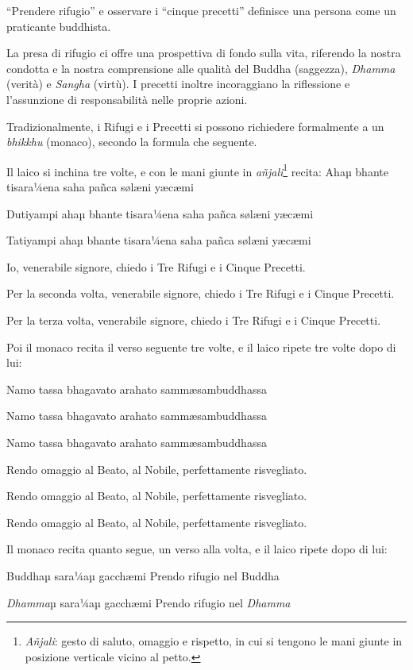 

``Prendere rifugio'' e osservare i ``cinque precetti'' definisce una persona
come un praticante buddhista.

La presa di rifugio ci offre una prospettiva di fondo sulla vita,
riferendo la nostra condotta e la nostra comprensione alle qualità del
Buddha (saggezza), \textit{Dhamma} (verità) e \textit{Sangha} (virtù). I precetti inoltre
incoraggiano la riflessione e l'assunzione di responsabilità nelle
proprie azioni.

Tradizionalmente, i Rifugi e i Precetti si possono richiedere
formalmente a un \textit{bhikkhu} (monaco), secondo la formula che seguente.

Il laico si inchina tre volte, e con le mani giunte in
\textit{añjali}\footnote{\textit{Añjali}: gesto di saluto, omaggio e rispetto, in cui si
tengono le mani giunte in posizione verticale vicino al petto.} recita:
Ahaµ bhante tisara¼ena saha pañca sølæni yæcæmi

Dutiyampi ahaµ bhante tisara¼ena saha pañca sølæni yæcæmi

Tatiyampi ahaµ bhante tisara¼ena saha pañca sølæni yæcæmi

Io, venerabile signore, chiedo i Tre Rifugi e i Cinque Precetti.

Per la seconda volta, venerabile signore, chiedo i Tre Rifugi e i Cinque
Precetti.

Per la terza volta, venerabile signore, chiedo i Tre Rifugi e i Cinque
Precetti.

Poi il monaco recita il verso seguente tre volte, e il laico ripete tre
volte dopo di lui:

Namo tassa bhagavato arahato sammæsambuddhassa

Namo tassa bhagavato arahato sammæsambuddhassa

Namo tassa bhagavato arahato sammæsambuddhassa

Rendo omaggio al Beato, al Nobile, perfettamente risvegliato.

Rendo omaggio al Beato, al Nobile, perfettamente risvegliato.

Rendo omaggio al Beato, al Nobile, perfettamente risvegliato.

Il monaco recita quanto segue, un verso alla volta, e il laico ripete
dopo di lui:

Buddhaµ sara¼aµ gacchæmi Prendo rifugio nel Buddha

\textit{Dhamma}µ sara¼aµ gacchæmi Prendo rifugio nel \textit{Dhamma}

